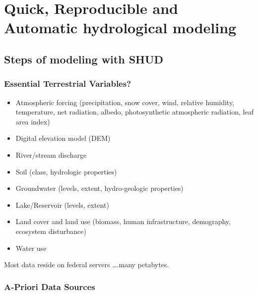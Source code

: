 \documentclass[]{scrbook}
\providecommand{\tightlist}{%
  \setlength{\itemsep}{0pt}\setlength{\parskip}{0pt}}
\begin{document}
\chapter{Quick, Reproducible and Automatic hydrological
modeling}\label{quick-reproducible-and-automatic-hydrological-modeling}

\section{Steps of modeling with SHUD}\label{steps-of-modeling-with-shud}

\subsection{Essential Terrestrial
Variables?}\label{essential-terrestrial-variables}

\begin{itemize}
\tightlist
\item
  Atmospheric forcing (precipitation, snow cover, wind, relative
  humidity, temperature, net radiation, albedo, photosynthetic
  atmospheric radiation, leaf area index)
\item
  Digital elevation model (DEM)
\item
  River/stream discharge
\item
  Soil (class, hydrologic properties)
\item
  Groundwater (levels, extent, hydro-geologic properties)
\item
  Lake/Reservoir (levels, extent)
\item
  Land cover and land use (biomass, human infrastructure, demography,
  ecosystem disturbance)
\item
  Water use
\end{itemize}

Most data reside on federal servers \ldots{}.many petabytes.

\subsection{A-Priori Data Sources}\label{a-priori-data-sources}
\end{document}
